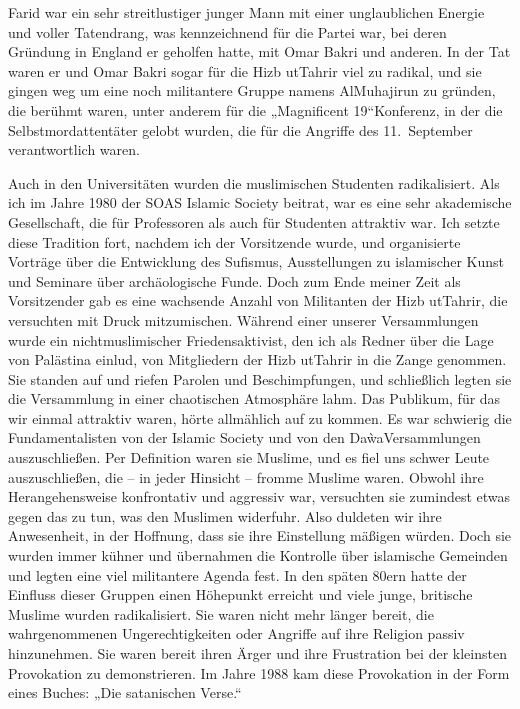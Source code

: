 \documentclass[12pt]{memoir}
\begin{document}
Farid war ein sehr streitlustiger junger Mann
mit einer unglaublichen Energie und voller Tatendrang,
was kennzeichnend für die Partei war,
bei deren Gründung in England er geholfen hatte,
mit Omar Bakri und anderen.
In der Tat waren er und Omar Bakri
sogar für die Hizb ut\–Tahrir viel zu radikal,
und sie gingen weg um eine noch militantere Gruppe
namens Al\–Muhajirun zu gründen,
die berühmt waren, unter anderem für die „Magnificent 19“\–Konferenz,
in der die Selbstmordattentäter gelobt wurden,
die für die Angriffe des 11.\ September verantwortlich waren.

Auch in den Universitäten wurden die muslimischen Studenten radikalisiert.
Als ich im Jahre 1980 der SOAS Islamic Society beitrat,
war es eine sehr akademische Gesellschaft,
die für Professoren als auch für Studenten attraktiv war.
Ich setzte diese Tradition fort, nachdem ich der Vorsitzende wurde,
und organisierte Vorträge über die Entwicklung des Sufismus,
Ausstellungen zu islamischer Kunst und Seminare über archäologische Funde.
Doch zum Ende meiner Zeit als Vorsitzender gab es eine wachsende Anzahl
von Militanten der Hizb ut\–Tahrir, die versuchten mit Druck mitzumischen.
Während einer unserer Versammlungen wurde
ein nicht\–muslimischer Friedensaktivist,
den ich als Redner über die Lage von Palästina einlud,
von Mitgliedern der Hizb ut\–Tahrir in die Zange genommen.
Sie standen auf und riefen Parolen und Beschimpfungen,
und schließlich legten sie die Versammlung
in einer chaotischen Atmosphäre lahm.
Das Publikum, für das wir einmal attraktiv waren,
hörte allmählich auf zu kommen.
Es war schwierig die Fundamentalisten von der Islamic Society
und von den Da\`wa\–Versammlungen auszuschließen.
Per Definition waren sie Muslime,
und es fiel uns schwer Leute auszuschließen,
die – in jeder Hinsicht – fromme Muslime waren.
Obwohl ihre Herangehensweise konfrontativ und aggressiv war,
versuchten sie zumindest etwas gegen das zu tun, was den Muslimen widerfuhr.
Also duldeten wir ihre Anwesenheit, in der Hoffnung,
dass sie ihre Einstellung mäßigen würden.
Doch sie wurden immer kühner
und übernahmen die Kontrolle über islamische Gemeinden
und legten eine viel militantere Agenda fest.
In den späten 80ern hatte der Einfluss dieser Gruppen einen Höhepunkt erreicht
und viele junge, britische Muslime wurden radikalisiert.
Sie waren nicht mehr länger bereit,
die wahrgenommenen Ungerechtigkeiten oder Angriffe auf ihre Religion
passiv hinzunehmen.
Sie waren bereit ihren Ärger und ihre Frustration
bei der kleinsten Provokation zu demonstrieren.
Im Jahre 1988 kam diese Provokation in der Form eines Buches:
„Die satanischen Verse.“
\end{document}
